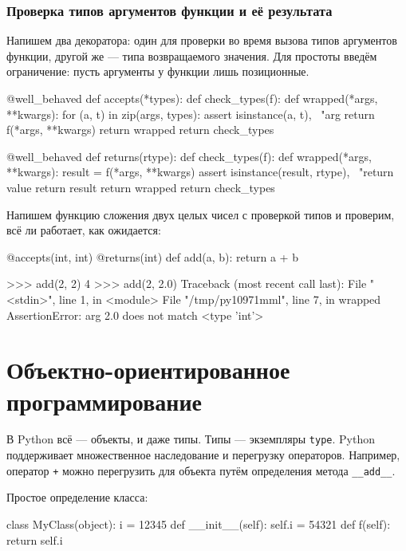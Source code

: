 \subsubsection{Проверка типов аргументов функции и её результата}
Напишем два декоратора: один для проверки во время вызова типов аргументов функции, другой же — типа возвращаемого значения. Для простоты введём ограничение: пусть аргументы у функции лишь позиционные.
\begin{pylst}{}{}
@well_behaved
def accepts(*types):
    def check_types(f):
        def wrapped(*args, **kwargs):
            for (a, t) in zip(args, types):
                assert isinstance(a, t), \
                       "arg %
            return f(*args, **kwargs)
        return wrapped
    return check_types

@well_behaved
def returns(rtype):
    def check_types(f):
        def wrapped(*args, **kwargs):
            result = f(*args, **kwargs)
            assert isinstance(result, rtype), \
                   "return value %
            return result
        return wrapped
    return check_types
\end{pylst}

Напишем функцию сложения двух целых чисел с проверкой типов и проверим, всё ли работает, как ожидается:
\begin{pylst}{}{}
@accepts(int, int)
@returns(int)
def add(a, b):
    return a + b

>>> add(2, 2)
4
>>> add(2, 2.0)
Traceback (most recent call last):
  File "<stdin>", line 1, in <module>
  File "/tmp/py10971mml", line 7, in wrapped
AssertionError: arg 2.0 does not match <type 'int'>
\end{pylst}

\section{Объектно-ориентированное программирование}
\label{sec:py-oop}
В Python всё --- объекты, и даже типы. Типы --- экземпляры \lstinline{type}. Python поддерживает множественное наследование и перегрузку операторов. Например, оператор \lstinline{+} можно перегрузить для объекта путём определения метода \lstinline{__add__}.

Простое определение класса:
\begin{pylst}{}{}
class MyClass(object):
    i = 12345
    def __init__(self):
        self.i = 54321
    def f(self):
        return self.i
\end{pylst}

